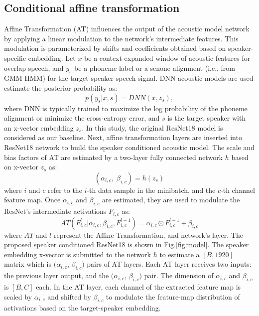 \documentclass{article}
\begin{document}
\subsection{Conditional affine transformation} Affine Transformation (AT) influences the output of the acoustic model network by applying a linear modulation to the network's intermediate features. This modulation is parameterized by shifts and coefficients obtained based on speaker-specific embedding. Let $x$ be a context-expanded window of acoustic features for overlap speech, and $y_s$ be a phoneme label or a senone alignment (i.e., from GMM-HMM) for the target-speaker speech signal. DNN acoustic models are used estimate the posterior probability as:
\begin{equation}
   p(y_s|x, s) = DNN(x, z_s),
\end{equation}
where DNN is typically trained to maximize the log probability of the phoneme alignment or minimize the cross-entropy error, and $s$ is the target speaker with an x-vector \cite{snyder2018x} embedding $z_s$. In this study, the original ResNet18 model is considered as our baseline. Next, affine transformation layers are inserted into ResNet18 network to build the speaker conditioned acoustic model. The scale and bias factors of AT are  estimated by a two-layer fully connected network $h$ based on x-vector $z_s$ as:
\begin{equation}
    (\alpha_{i,c},\; \beta_{i,c}) = h(z_s)
\end{equation}
where  $i$ and $c$ refer to the $i$-th data sample in the minibatch, and the $c$-th channel feature map. Once $\alpha_{i,c}$ and $\beta_{i,c}$ are estimated, they are used to modulate the ResNet's intermediate activations $F_{i,c}$ as:
\begin{equation}
      AT(F_{i,c}^{l}| \alpha_{i,c}, \beta_{i,c}, F_{i,c}^{l-1}) = \alpha_{i,c} \odot  F_{i,c}^{l-1} + \beta_{i,c}
\end{equation}
where $AT$ and $l$ represent the Affine Transformation, and network's layer. The proposed speaker conditioned ResNet18 is shown in Fig.\ref{fig:model}.  The speaker embedding x-vector is submitted to the network $h$ to estimate a $[B, 1920]$ matrix which is $(\alpha_{i,c}$, $\beta_{i,c})$ pairs of AT layers. Each AT layer receives two inputs:  the previous layer output, and the $(\alpha_{i,c}$, $\beta_{i,c})$ pair. The dimension of $\alpha_{i,c}$ and $\beta_{i,c}$ is $[B, C]$ each. In the AT layer, each channel of the extracted feature map is scaled by $\alpha_{i,c}$ and shifted by $\beta_{i,c}$ to modulate the feature-map distribution of activations based on the target-speaker embedding.
\end{document}
